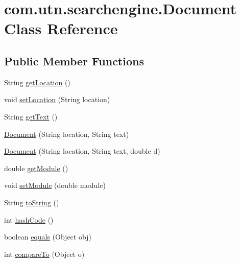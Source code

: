 \hypertarget{classcom_1_1utn_1_1searchengine_1_1_document}{\section{com.\-utn.\-searchengine.\-Document \-Class \-Reference}
\label{classcom_1_1utn_1_1searchengine_1_1_document}
}
\subsection*{\-Public \-Member \-Functions}
\begin{DoxyCompactItemize}
\item 
\-String \hyperlink{classcom_1_1utn_1_1searchengine_1_1_document_a874682a9030d3f8d4db5fc37378c187a}{get\-Location} ()
\item 
void \hyperlink{classcom_1_1utn_1_1searchengine_1_1_document_a3e870ec20231ac619470b702114f75a4}{set\-Location} (\-String location)
\item 
\-String \hyperlink{classcom_1_1utn_1_1searchengine_1_1_document_a9e04191fbfb216f404382936e4922235}{get\-Text} ()
\item 
\hyperlink{classcom_1_1utn_1_1searchengine_1_1_document_a2bf3900eaa695bb2ba942545e4eefd57}{\-Document} (\-String location, \-String text)
\item 
\hyperlink{classcom_1_1utn_1_1searchengine_1_1_document_ab12459363476fbdb98d9bf17b1f606da}{\-Document} (\-String location, \-String text, double d)
\item 
double \hyperlink{classcom_1_1utn_1_1searchengine_1_1_document_a2b03754624147f5f1a9ea50c549e9606}{get\-Module} ()
\item 
void \hyperlink{classcom_1_1utn_1_1searchengine_1_1_document_ad8a50ff977b6138ae86a199a1f987459}{set\-Module} (double module)
\item 
\-String \hyperlink{classcom_1_1utn_1_1searchengine_1_1_document_a392cda204fab3af44b1799131ec59ad0}{to\-String} ()
\item 
int \hyperlink{classcom_1_1utn_1_1searchengine_1_1_document_a988ff8921d036030105efa8327ae5203}{hash\-Code} ()
\item 
boolean \hyperlink{classcom_1_1utn_1_1searchengine_1_1_document_a2240cbc411e5c2e79990cbf6da9a085b}{equals} (\-Object obj)
\item 
int \hyperlink{classcom_1_1utn_1_1searchengine_1_1_document_aacc9fbc76953355819d9bd1354e1e159}{compare\-To} (\-Object o)
\end{DoxyCompactItemize}


